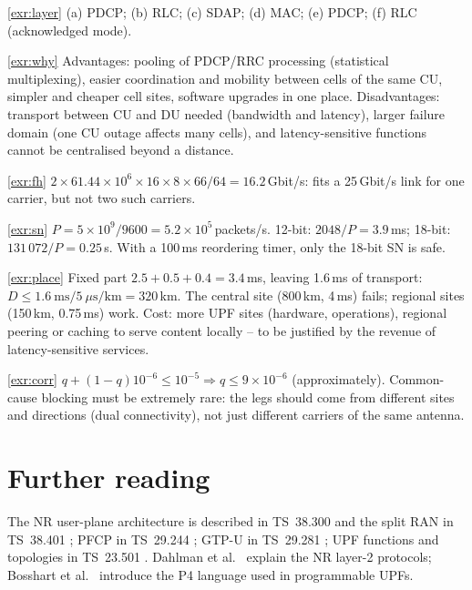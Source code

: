 \documentclass[11pt,a4paper]{article}
\begin{document}
\begin{solutionbox}{\ref{exr:layer}}
(a) PDCP; (b) RLC; (c) SDAP; (d) MAC; (e) PDCP; (f) RLC (acknowledged mode).
\end{solutionbox}

\begin{solutionbox}{\ref{exr:why}}
Advantages: pooling of PDCP/RRC processing (statistical multiplexing), easier coordination and mobility between cells of the same CU, simpler and cheaper cell sites,
software upgrades in one place. Disadvantages: transport between CU and DU needed (bandwidth and latency), larger failure domain (one CU outage affects many cells), and
latency-sensitive functions cannot be centralised beyond a distance.
\end{solutionbox}

\begin{solutionbox}{\ref{exr:fh}}
$2\times61.44\times10^6\times16\times8\times66/64 = 16.2$\,Gbit/s: fits a 25\,Gbit/s link for one carrier, but not two such carriers.
\end{solutionbox}

\begin{solutionbox}{\ref{exr:sn}}
$P = 5\times10^9/9600 = 5.2\times10^5$\,packets/s. 12-bit: $2048/P = 3.9$\,ms; 18-bit: $131\,072/P = 0.25$\,s. With a 100\,ms reordering timer, only the 18-bit SN is safe.
\end{solutionbox}

\begin{solutionbox}{\ref{exr:place}}
Fixed part $2.5 + 0.5 + 0.4 = 3.4$\,ms, leaving 1.6\,ms of transport: $D \le 1.6\ \text{ms}/5\ \mu\text{s/km} = 320$\,km. The central site (800\,km, 4\,ms) fails; regional sites
(150\,km, 0.75\,ms) work. Cost: more UPF sites (hardware, operations), regional peering or caching to serve content locally -- to be justified by the revenue of
latency-sensitive services.
\end{solutionbox}

\begin{solutionbox}{\ref{exr:corr}}
$q + (1-q)10^{-6} \le 10^{-5} \Rightarrow q \le 9\times10^{-6}$ (approximately). Common-cause blocking must be extremely rare: the legs should come from different sites and
directions (dual connectivity), not just different carriers of the same antenna.
\end{solutionbox}

\section{Further reading}
The NR user-plane architecture is described in TS~38.300 \cite{ts38300} and the split RAN in TS~38.401 \cite{ts38401}; PFCP in TS~29.244 \cite{ts29244}; GTP-U in TS~29.281
\cite{ts29281}; UPF functions and topologies in TS~23.501 \cite{ts23501}. Dahlman et al.\ \cite{dahlman2020nr} explain the NR layer-2 protocols; Bosshart et al.\
\cite{bosshart2014p4} introduce the P4 language used in programmable UPFs.

\printbibliography[heading=subbibliography,title={\ACNstrRefs}]
\end{document}
